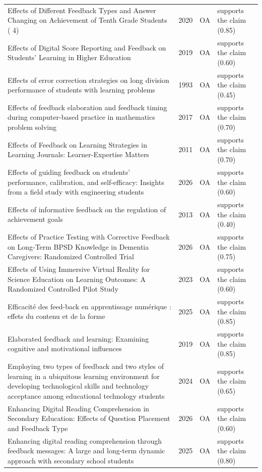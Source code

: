 \begin{longtable}{@{}%
  >{\raggedright\arraybackslash}p{}c%
  >{\raggedright\arraybackslash}p{}%
  >{\raggedright\arraybackslash}p{}@{}}
Effects of Different Feedback Types and Answer Changing on Achievement of Tenth Grade Students ( 4) & 2020 & OA & supports the claim (0.85) \\
Effects of Digital Score Reporting and Feedback on Students' Learning in Higher Education & 2019 & OA & supports the claim (0.60) \\
Effects of error correction strategies on long division performance of students with learning problems & 1993 & OA & supports the claim (0.45) \\
Effects of feedback elaboration and feedback timing during computer-based practice in mathematics problem solving & 2017 & OA & supports the claim (0.70) \\
Effects of Feedback on Learning Strategies in Learning Journals: Learner-Expertise Matters & 2011 & OA & supports the claim (0.70) \\
Effects of guiding feedback on students' performance, calibration, and self-efficacy: Insights from a field study with engineering students & 2026 & OA & supports the claim (0.60) \\
Effects of informative feedback on the regulation of achievement goals & 2013 & OA & supports the claim (0.40) \\
Effects of Practice Testing with Corrective Feedback on Long-Term BPSD Knowledge in Dementia Caregivers: Randomized Controlled Trial & 2026 & OA & supports the claim (0.75) \\
Effects of Using Immersive Virtual Reality for Science Education on Learning Outcomes: A Randomized Controlled Pilot Study & 2023 & OA & supports the claim (0.60) \\
Efficacité des feed-back en apprentissage numérique : effets du contenu et de la forme & 2025 & OA & supports the claim (0.85) \\
Elaborated feedback and learning: Examining cognitive and motivational influences & 2019 & OA & supports the claim (0.85) \\
Employing two types of feedback and two styles of learning in a ubiquitous learning environment for developing technological skills and technology acceptance among educational technology students & 2024 & OA & supports the claim (0.65) \\
Enhancing Digital Reading Comprehension in Secondary Education: Effects of Question Placement and Feedback Type & 2026 & OA & supports the claim (0.60) \\
Enhancing digital reading comprehension through feedback messages: A large and long-term dynamic approach with secondary school students & 2025 & OA & supports the claim (0.80) \\

\end{longtable}
